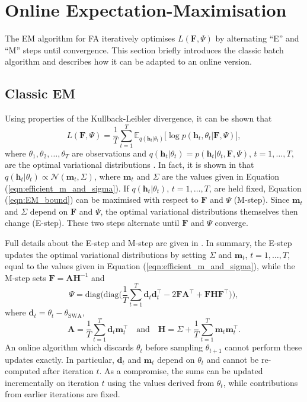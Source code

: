 \documentclass[msc,deptreport.inf]{infthesis} %
\newcommand{\matr}[1]{\mathbf{#1}}
\newcommand{\E}{\mathbb E}
\begin{document}
\section{Online Expectation-Maximisation}\label{sec:online_em}

The EM algorithm for FA iteratively optimises $L(\matr{F}, \Psi)$ by alternating ``E'' and ``M'' steps until convergence. This section briefly introduces the classic batch algorithm and describes how it can be adapted to an online version. 

\subsection{Classic EM}

Using properties of the Kullback-Leibler divergence, it can be shown that 
\begin{equation}\label{eqn:EM_bound}
	L(\matr{F}, \Psi) = \frac{1}{T} \sum_{t=1}^T \E_{q(\matr{h}_t | \theta_t)} \big[\log p(\matr{h}_t, \theta_t | \matr{F}, \Psi)\big],
\end{equation}
where $\theta_1, \theta_2, \dots,\theta_T$ are observations and $q(\matr{h}_t | \theta_t) = p(\matr{h}_t | \theta_t, \matr{F}, \Psi)$, $t=1, \dots, T$, are the optimal variational distributions \cite{barber2007}. In fact, it is shown in \cite{barber2007} that $q(\matr{h}_t | \theta_t) \propto \mathcal{N}(\matr{m}_t, \Sigma)$, where $\matr{m}_t$ and $\Sigma$ are the values given in Equation (\ref{eqn:efficient_m_and_sigma}). If $q(\matr{h}_t | \theta_t)$, $t=1, \dots, T$, are held fixed, Equation (\ref{eqn:EM_bound}) can be maximised with respect to $\matr{F}$ and $\Psi$ (M-step). Since $\matr{m}_t$ and $\Sigma$ depend on $\matr{F}$ and $\Psi$, the optimal variational distributions themselves then change (E-step). These two steps alternate until $\matr{F}$ and $\Psi$ converge. 

Full details about the E-step and M-step are given in \cite{barber2007}. In summary, the E-step updates the optimal variational distributions by setting $\Sigma$ and $\matr{m}_t$, $t=1,\dots,T$, equal to the values given in Equation (\ref{eqn:efficient_m_and_sigma}), while the M-step sets $\matr{F} = \matr{A}\matr{H}^{-1}$ and
\begin{equation}\label{eqn:em_Psi_update}
	\Psi = \text{diag}\Bigg(\text{diag}\Bigg( \frac{1}{T} \sum_{t=1}^T \matr{d}_t \matr{d}_t^\intercal - 2\matr{FA}^\intercal + \matr{FHF}^\intercal \Bigg)\Bigg),
\end{equation}
where $\matr{d}_t = \theta_t - \theta_{\text{SWA}}$,
\begin{equation}\label{eqn:em_A_and_H_update}
	\matr{A} = \frac{1}{T} \sum_{t=1}^T \matr{d}_t \matr{m}_t^\intercal \quad \text{and} \quad 
	\matr{H} = \Sigma + \frac{1}{T} \sum_{t=1}^T \matr{m}_t \matr{m}_t^\intercal.
\end{equation}
An online algorithm which discards $\theta_t$ before sampling $\theta_{t + 1}$ cannot perform these updates exactly. In particular, $\matr{d}_t$ and $\matr{m}_t$ depend on $\theta_t$ and cannot be re-computed after iteration $t$. As a compromise, the sums can be updated incrementally on iteration $t$ using the values derived from $\theta_t$, while contributions from earlier iterations are fixed.
\end{document}
